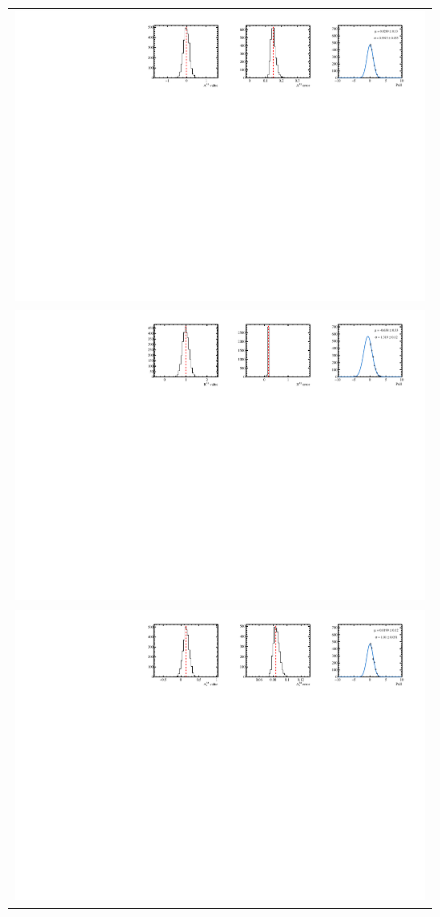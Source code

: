 \begin{figure}
  \centering
  \begin{tabular}{c}
\includegraphics[width=\textwidth]{ANA_resources/Plots/Data_fit/FitterBias//A_signal_pipipipi_run2.pdf} \\
\includegraphics[width=\textwidth]{ANA_resources/Plots/Data_fit/FitterBias//R_signal_pipipipi_run2.pdf} \\
\includegraphics[width=\textwidth]{ANA_resources/Plots/Data_fit/FitterBias//A_Bs_pipipipi_run2.pdf} \\

\end{tabular}
\end{figure}
